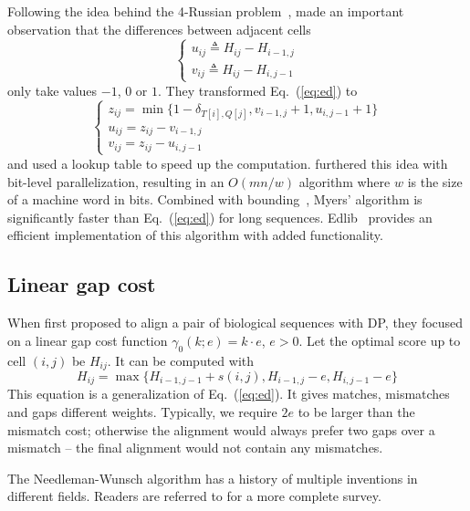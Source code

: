 \documentclass{bioinfo}
\begin{document}
\begin{methods}
Following the idea behind the 4-Russian problem~\citep{Arlazarov:1970aa},
\citet{Wu:1996aa} made an important observation that the differences
between adjacent cells
\[\left\{\begin{array}{l}
u_{ij}\triangleq H_{ij}-H_{i-1,j}\\
v_{ij}\triangleq H_{ij}-H_{i,j-1}
\end{array}\right.\]
only take values $-1$, $0$ or $1$. They transformed Eq.~(\ref{eq:ed}) to
\begin{equation}
\left\{\begin{array}{l}
z_{ij}=\min\{1-\delta_{T[i],Q[j]},v_{i-1,j}+1,u_{i,j-1}+1\}\\
u_{ij}=z_{ij}-v_{i-1,j}\\
v_{ij}=z_{ij}-u_{i,j-1}
\end{array}\right.
\end{equation}
and used a lookup table to speed up the computation. \citet{Myers:1999aa}
furthered this idea with bit-level parallelization, resulting in an $O(mn/w)$
algorithm where $w$ is the size of a machine word in bits. Combined with
bounding~\citep{Ukkonen:1985aa}, Myers' algorithm is significantly faster than
Eq.~(\ref{eq:ed}) for long sequences.  Edlib~\citep{Sosic:2017aa} provides an
efficient implementation of this algorithm with added functionality.

\subsection{Linear gap cost}

When \citet{Needleman:1970aa} first proposed to align a pair of biological
sequences with DP, they focused on a linear gap cost function
$\gamma_0(k;e)=k\cdot e$, $e>0$. Let the optimal score up to cell $(i,j)$ be
$H_{ij}$. It can be computed with
\begin{equation}\label{eq:linear}
H_{ij}=\max\{H_{i-1,j-1}+s(i,j), H_{i-1,j}-e, H_{i,j-1}-e\}
\end{equation}
This equation is a generalization of Eq.~(\ref{eq:ed}). It gives matches,
mismatches and gaps different weights. Typically, we require $2e$ to be larger
than the mismatch cost; otherwise the alignment would always prefer two gaps
over a mismatch -- the final alignment would not contain any mismatches.

The Needleman-Wunsch algorithm has a history of multiple inventions in
different fields. Readers are referred to \citet{Navarro:2001aa} for a more
complete survey.


\end{methods}
\end{document}
